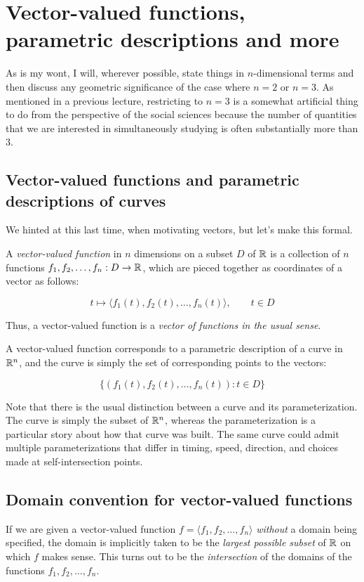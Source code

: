 \documentclass[10pt]{amsart}
\begin{document}
\section{Vector-valued functions, parametric descriptions and more}

As is my wont, I will, wherever possible, state things in
$n$-dimensional terms and then discuss any geometric significance of
the case where $n = 2$ or $n = 3$. As mentioned in a previous lecture,
restricting to $n = 3$ is a somewhat artificial thing to do from the
perspective of the social sciences because the number of quantities
that we are interested in simultaneously studying is often
substantially more than $3$.

\subsection{Vector-valued functions and parametric descriptions of curves}

We hinted at this last time, when motivating vectors, but let's make
this formal.

A {\em vector-valued function} in $n$ dimensions on a subset $D$ of
$\mathbb{R}$ is a collection of $n$ functions $f_1, f_2, \dots, f_n: D \to
\mathbb{R}$, which are pieced together as coordinates of a vector as follows:

$$t \mapsto \langle f_1(t), f_2(t), \dots, f_n(t) \rangle, \qquad t \in D$$

Thus, a vector-valued function is a {\em vector of functions in the
usual sense}.

A vector-valued function corresponds to a parametric description of a
curve in $\mathbb{R}^n$, and the curve is simply the set of corresponding
points to the vectors:

$$\{ (f_1(t),f_2(t), \dots, f_n(t)) : t \in D \}$$

Note that there is the usual distinction between a curve and its
parameterization. The curve is simply the subset of $\mathbb{R}^n$, whereas
the parameterization is a particular story about how that curve was
built. The same curve could admit multiple parameterizations that
differ in timing, speed, direction, and choices made at
self-intersection points.
\subsection{Domain convention for vector-valued functions}

If we are given a vector-valued function $f = \langle f_1, f_2, \dots,
f_n \rangle$ {\em without} a domain being specified, the domain is
implicitly taken to be the {\em largest possible subset} of $\mathbb{R}$ on
which $f$ makes sense. This turns out to be the {\em intersection} of
the domains of the functions $f_1, f_2, \dots, f_n$.
\end{document}
